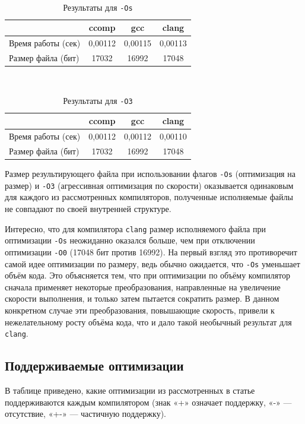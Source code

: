 \documentclass[a4paper]{article}
\begin{document}
\\
\begin{table}[H]
\centering
\caption{Результаты для \texttt{-Os}}
\begin{tabular}{lccc}
\toprule
& \textbf{ccomp} & \textbf{gcc} & \textbf{clang} \\
\midrule
Время работы (сек) & 0,00112 & 0,00115 & 0,00113 \\
Размер файла (бит) & 17032   & 16992   & 17048 \\
\bottomrule
\end{tabular}
\end{table}

\\
\begin{table}[H]
\centering
\caption{Результаты для \texttt{-O3}}
\begin{tabular}{lccc}
\toprule
& \textbf{ccomp} & \textbf{gcc} & \textbf{clang} \\
\midrule
Время работы (сек) & 0,00112 & 0,00112 & 0,00110 \\
Размер файла (бит) & 17032   & 16992   & 17048 \\
\bottomrule
\end{tabular}
\end{table}

\bigskip
\bigskip


Размер результирующего файла при использовании флагов \texttt{-Os} (оптимизация на размер) и \texttt{-O3} (агрессивная оптимизация по скорости) оказывается одинаковым для каждого из рассмотренных компиляторов, полученные исполняемые файлы не совпадают по своей внутренней структуре.
\medskip


Интересно, что для компилятора \texttt{clang} размер исполняемого файла при оптимизации \texttt{-Os} неожиданно оказался больше, чем при отключении оптимизации \texttt{-O0} (17048 бит против 16992). На первый взгляд это противоречит самой идее оптимизации по размеру, ведь обычно ожидается, что \texttt{-Os} уменьшает объём кода. Это объясняется тем, что при оптимизации по объёму компилятор сначала применяет некоторые преобразования, направленные на увеличение скорости выполнения, и только затем пытается сократить размер. В данном конкретном случае эти преобразования, повышающие скорость, привели к нежелательному росту объёма кода, что и дало такой необычный результат для \texttt{clang}.

\medskip





\subsection{Поддерживаемые оптимизации}
В таблице приведено, какие оптимизации из рассмотренных в статье поддерживаются каждым компилятором (знак «+» означает поддержку, «-» — отсутствие, «+-» — частичную поддержку).
\end{document}
